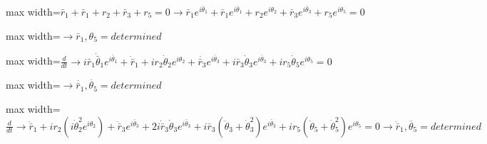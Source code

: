 \documentclass[11pt,a4paper]{article}
\begin{document}
\begin{center}\begin{adjustbox}{max width=\linewidth}$\displaystyle {\bar{r}}_{1}+{\bar{r}}_{1}+{r}_{2}+{\bar{r}}_{3}+{r}_{5}=0\rightarrow {\bar{r}}_{1}{e}^{i{\bar{\theta }}_{1}}+{\bar{r}}_{1}{e}^{i{\bar{\theta }}_{1}}+{r}_{2}{e}^{i{\theta }_{2}}+{\bar{r}}_{3}{e}^{i{\bar{\theta }}_{3}}+{r}_{5}{e}^{i{\theta }_{5}}=0$\end{adjustbox}\end{center}

\begin{center}\begin{adjustbox}{max width=\linewidth}$\displaystyle \rightarrow {\bar{r}}_{1},{\theta }_{5}=determined$\end{adjustbox}\end{center}

\begin{center}\begin{adjustbox}{max width=\linewidth}$\displaystyle \frac{d}{dt}\rightarrow i{\bar{r}}_{1}{\dot{\bar{\theta }}}_{1}{e}^{i{\bar{\theta }}_{1}}+{\dot{\bar{r}}}_{1}+i{r}_{2}{\dot{\theta }}_{2}{e}^{i{\theta }_{2}}+\dot{{\bar{r}}_{3}}{e}^{i{\bar{\theta }}_{3}}+{i\bar{r}}_{3}{\dot{\theta }}_{3}{e}^{i{\bar{\theta }}_{3}}+i{r}_{5}{\dot{\theta }}_{5}{e}^{i{\theta }_{5}}=0$\end{adjustbox}\end{center}

\begin{center}\begin{adjustbox}{max width=\linewidth}$\displaystyle \rightarrow \dot{{\bar{r}}_{1}},\dot{{\theta }_{5}}=determined$\end{adjustbox}\end{center}

\begin{center}\begin{adjustbox}{max width=\linewidth}$\displaystyle \frac{d}{dt}\rightarrow {\ddot{\bar{r}}}_{1}+i{r}_{2}\left( i{\dot{\theta }}_{2}^{2}{e}^{i{\theta }_{2}}\right)+{\ddot{\bar{r}}}_{3}{e}^{i{\bar{\theta }}_{3}}+{2i\dot{\bar{r}}}_{3}{\dot{\theta }}_{3}{e}^{i{\bar{\theta }}_{3}}+i{\bar{r}}_{3}({\ddot{\theta }}_{3}+{\dot{\theta }}_{3}^{2}){e}^{i{\bar{\theta }}_{3}}+i{r}_{5}({\ddot{\theta }}_{5}+{\dot{\theta }}_{5}^{2}){e}^{i{\theta }_{5}}=0\rightarrow {\ddot{\bar{r}}}_{1},\ddot{{\theta }_{5}}=determined$\end{adjustbox}\end{center}
\end{document}
